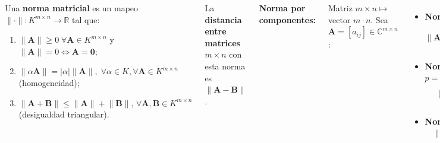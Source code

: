 \documentclass[9pt, aspectratio=169]{beamer}
\begin{document}
\begin{frame}
\begin{columns}[t]
\cx
\begin{definition}
    Una \textbf{norma matricial} es un mapeo $\lVert \cdot \rVert : K^{m \times n} \rightarrow \mathbb{R}$ tal que:
\begin{enumerate}
    \item $\lVert \bm{A} \rVert \geq 0 \; \forall \bm{A} \in K^{m \times n}$ y $\lVert \bm{A} \rVert = 0 \Leftrightarrow \bm{A} = \bm{0}$;
    \item $\lVert \alpha \bm{A} \rVert = |\alpha| \lVert \bm{A} \rVert, \; \forall \alpha \in K, \forall \bm{A} \in K^{m \times n}$ (homogeneidad);
    \item $\lVert \bm{A} + \bm{B} \rVert \leq \lVert \bm{A} \rVert + \lVert \bm{B} \rVert, \, \forall \bm{A}, \bm{B} \in K^{m \times n}$ (desigualdad triangular).
\end{enumerate}
\end{definition}

La \textbf{distancia entre matrices $m \times n$} con esta norma es $\lVert \bm{A} - \bm{B} \rVert$.
\pause

\cx

\textbf{Norma por componentes:}

Matriz $m \times n \mapsto$ vector $m \cdot n$. Sea $\bm{A} = [a_{ij}] \in \mathbb{C}^{m \times n}$:
\begin{itemize}
    \item \textbf{Norma $p$:}
        \[ \lVert \bm{A} \rVert_p = \left( \sum_{i=1}^m \sum_{j=1}^n |a_{ij}|^p \right)^{1/p} \]
    \item \textbf{Norma de Frobenius:} ($p = 2$)
\[ \lVert \bm{A} \rVert_F^2 = \sum_{i=1}^m \sum_{j=1}^n |a_{ij}|^2 \]
\item \textbf{Norma máxima:}
    \[ \lVert \bm{A} \rVert_{\text{máx}} = \max_{\substack{1 \leq i \leq m \\ 1 \leq j \leq n}} |a_{ij}| \]
\end{itemize}

\end{columns}
\end{frame}
\end{document}
